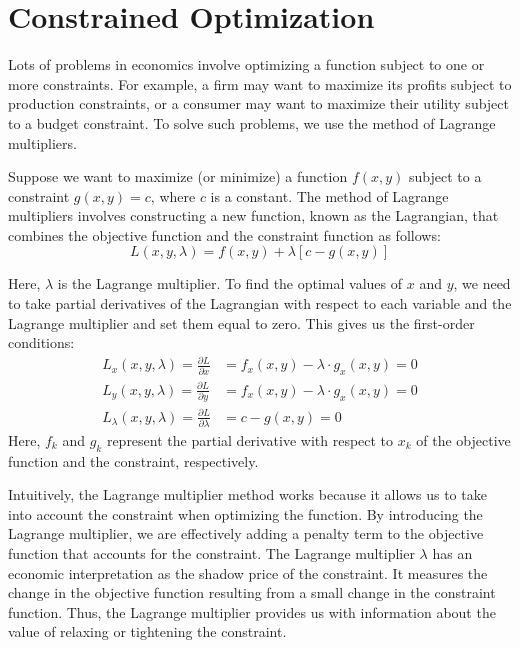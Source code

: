 \documentclass{./../Latex/handout}
\begin{document}

\section{Constrained Optimization}
Lots of problems in economics involve optimizing a function subject to one or more constraints. For example, a firm may want to maximize its profits subject to production constraints, or a consumer may want to maximize their utility subject to a budget constraint. To solve such problems, we use the method of Lagrange multipliers. 

Suppose we want to maximize (or minimize) a function $f(x,y)$ subject to a constraint $g(x,y) = c$, where $c$ is a constant. The method of Lagrange multipliers involves constructing a new function, known as the Lagrangian, that combines the objective function and the constraint function as follows:
$$
L(x,y,\lambda)=f(x, y)+\lambda[c-g(x, y)]
$$

Here, $\lambda$ is the Lagrange multiplier. To find the optimal values of $x$ and $y$, we need to take partial derivatives of the Lagrangian with respect to each variable and the Lagrange multiplier and set them equal to zero. This gives us the first-order conditions:
\begin{align*}
L_x(x,y,\lambda) = \frac{\partial L}{\partial x} &= f_x(x, y)- \lambda \cdot g_x(x, y) = 0 \\
L_y(x,y,\lambda) = \frac{\partial L}{\partial y} &= f_x(x, y)- \lambda \cdot g_x(x, y) = 0 \\
L_{\lambda}(x,y,\lambda) = \frac{\partial L}{\partial \lambda} &= c-g(x, y) = 0 
\end{align*}
Here, $f_k$ and $g_k$ represent the partial derivative with respect to $x_k$ of the objective function and the constraint, respectively. 

Intuitively, the Lagrange multiplier method works because it allows us to take into account the constraint when optimizing the function. By introducing the Lagrange multiplier, we are effectively adding a penalty term to the objective function that accounts for the constraint. The Lagrange multiplier $\lambda$ has an economic interpretation as the shadow price of the constraint. It measures the change in the objective function resulting from a small change in the constraint function. Thus, the Lagrange multiplier provides us with information about the value of relaxing or tightening the constraint.\\
\end{document}
